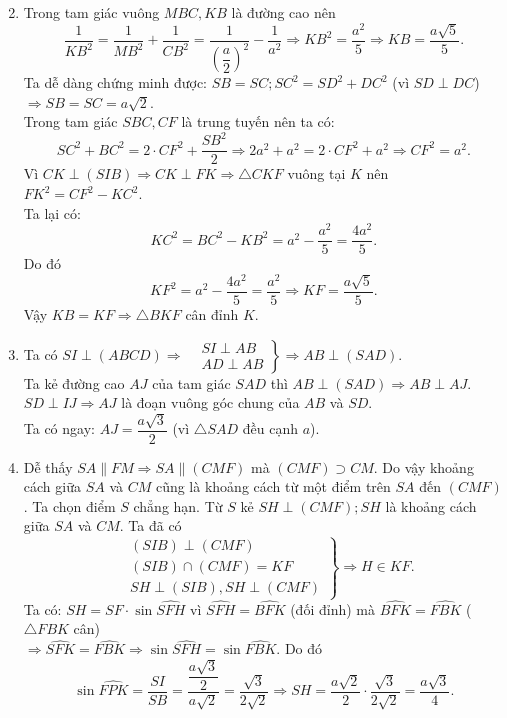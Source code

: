 \begin{bt}
{	\begin{enumerate}\setcounter{enumi}{1}
		\item Trong tam giác vuông $MBC,KB$ là đường cao nên 
		$$\dfrac{1}{KB^2}=\dfrac{1}{MB^2}+\dfrac{1}{CB^2}=\dfrac{1}{\left(\dfrac{a}{2}\right)^2}-\dfrac{1}{a^2} \Rightarrow KB^2=\dfrac{a^2}{5} \Rightarrow KB=\dfrac{a\sqrt{5}}{5}.$$
		Ta dễ dàng chứng minh được: $SB=SC;SC^2=SD^2+DC^2$ (vì $SD\perp DC$) $ \Rightarrow SB=SC=a\sqrt{2}$. \\
		Trong tam giác $SBC,CF$ là trung tuyến nên ta có: $$SC^2+BC^2=2\cdot CF^2+\dfrac{SB^2}{2} \Rightarrow 2a^2+a^2=2\cdot CF^2+a^2 \Rightarrow CF^2=a^2.$$
		Vì $CK\perp (SIB) \Rightarrow CK\perp FK \Rightarrow \triangle CKF$ vuông tại $K$ nên $FK^2=CF^2-KC^2$. \\
		Ta lại có: $$KC^2=BC^2-KB^2=a^2-\dfrac{a^2}{5}=\dfrac{4a^2}{5}.$$
		Do đó $$KF^2=a^2-\dfrac{4a^2}{5}=\dfrac{a^2}{5} \Rightarrow KF=\dfrac{a\sqrt{5}}{5}.$$
		Vậy $KB=KF \Rightarrow \triangle BKF$ cân đỉnh $K$. \\
		\item Ta có $SI\perp (ABCD) \Rightarrow \left.\begin{aligned}
		&SI\perp AB \\
		&AD\perp AB
		\end{aligned}\right\} \Rightarrow AB\perp (SAD)$. \\
		Ta kẻ đường cao $AJ$ của tam giác $SAD$ thì $AB\perp (SAD) \Rightarrow AB\perp AJ$. \\
		$SD\perp IJ \Rightarrow AJ$ là đoạn vuông góc chung của $AB$ và $SD$. \\
		Ta có ngay: $AJ=\dfrac{a\sqrt{3}}{2}$ (vì $\triangle SAD$ đều cạnh $a$). \\
		\item Dễ thấy $SA\parallel FM \Rightarrow SA\parallel (CMF)$ mà $(CMF)\supset CM$. Do vậy khoảng cách giữa $SA$ và $CM$ cũng là khoảng cách từ một điểm trên $SA$ đến $(CMF)$. Ta chọn điểm $S$ chẳng hạn. Từ $S$ kẻ $SH\perp (CMF);SH$ là khoảng cách giữa $SA$ và $CM$. Ta đã có 
		$$\left.\begin{aligned}
		&(SIB)\perp (CMF) \\
		&(SIB)\cap (CMF)=KF \\
		&SH\perp (SIB),SH\perp (CMF)
		\end{aligned}\right\} \Rightarrow H\in KF.$$
		Ta có: $SH=SF\cdot \sin \widehat{SFH}$ vì $\widehat{SFH}=\widehat{BFK}$ (đối đỉnh) mà $\widehat{BFK}=\widehat{FBK}$ ($\triangle FBK$ cân) \\
		$ \Rightarrow \widehat{SFK}=\widehat{FBK} \Rightarrow \sin \widehat{SFH}=\sin \widehat{FBK}$. Do đó\\
		$$\sin \widehat{FPK}=\dfrac{SI}{SB}=\dfrac{\dfrac{a\sqrt{3}}{2}}{a\sqrt{2}}=\dfrac{\sqrt{3}}{2\sqrt{2}} \Rightarrow SH=\dfrac{a\sqrt{2}}{2}\cdot \dfrac{\sqrt{3}}{2\sqrt{2}}=\dfrac{a\sqrt{3}}{4}.$$ 
	\end{enumerate}
		
	}
\end{bt}

